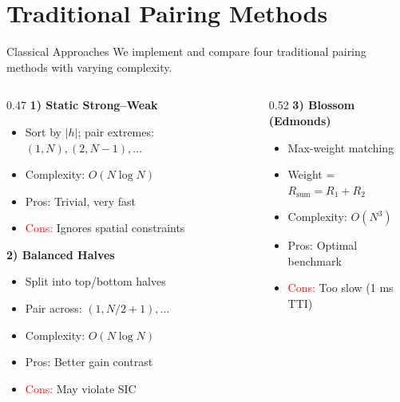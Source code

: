 \documentclass[aspectratio=169]{beamer}
\begin{document}
\section{Traditional Pairing Methods}

\begin{frame}{Classical Approaches}
    \vspace{-0.2cm}
    \small \textcolor{iiitblue}{We implement and compare four traditional pairing methods with varying complexity.}
    
    \begin{columns}[T,onlytextwidth]
        \begin{column}{0.47\textwidth}
            \textbf{1) Static Strong–Weak}
            \begin{itemize}\itemsep0.15em
                \item Sort by $|h|$; pair extremes: $(1,N), (2,N-1), \ldots$
                \item Complexity: $O(N\log N)$
                \item \textcolor{nomagreen}{Pros:} Trivial, very fast
                \item \textcolor{red}{Cons:} Ignores spatial constraints
            \end{itemize}

            \vspace{0.3em}

            \textbf{2) Balanced Halves}
            \begin{itemize}\itemsep0.15em
                \item Split into top/bottom halves
                \item Pair across: $(1, N/2+1), \ldots$
                \item Complexity: $O(N\log N)$
                \item \textcolor{nomagreen}{Pros:} Better gain contrast
                \item \textcolor{red}{Cons:} May violate SIC
            \end{itemize}
            \end{column}
            
            \begin{column}{0.52\textwidth}
            \textbf{3) Blossom (Edmonds)}
            \begin{itemize}\itemsep0.15em
                \item Max-weight matching
                \item Weight = $R_{\text{sum}} = R_1 + R_2$
                \item Complexity: $O(N^3)$
                \item \textcolor{nomagreen}{Pros:} Optimal benchmark
                \item \textcolor{red}{Cons:} Too slow (1 ms TTI)
            \end{itemize}
        


\end{column}
\end{columns}
\end{frame}
\end{document}
